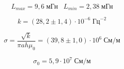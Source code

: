 \[
    L_{max} = 9{,}6\;\text{мГн}\;\;\; L_{min} = 2{,}38\;\text{мГн}
\]

\[
    k = \left(28{,}2 \pm 1{,}4\right)\cdot 10^{-6}\;\text{Гц}^{-2}
\]

\[
    \sigma = \frac{\sqrt{k}}{\pi ah \mu_0} = \left(39{,}8 \pm 1{,}0\right)\cdot 10^{6}\;\text{См} / \text{м}
\]

\[
    \sigma_0 = 5{,}9\cdot 10^7\;\text{См}/\text{м}
\]
\begin{figure}[ht!]
\end{figure}

